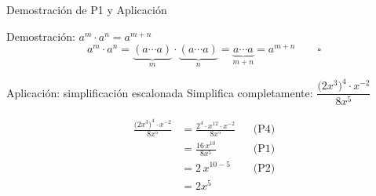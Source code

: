 \documentclass[12pt,aspectratio=169]{beamer}
\begin{document}
\begin{frame}{Demostraci\'on de P1 y Aplicaci\'on}
  \begin{block}{Demostraci\'on: $a^{m}\cdot a^{n}=a^{m+n}$}
    \[
      a^{m}\cdot a^{n}
      =\underbrace{(a\cdots a)}_{m}\cdot\underbrace{(a\cdots a)}_{n}
      =\underbrace{a\cdots a}_{m+n}=a^{m+n}\qquad\square
    \]
  \end{block}
  \vspace{6pt}
  \begin{cejec}{Aplicaci\'on: simplificaci\'on escalonada}
    Simplifica completamente:\quad
    $\dfrac{\bigl(2x^{3}\bigr)^{4}\cdot x^{-2}}{8x^{5}}$

    \medskip
    \begin{align*}
      \frac{\bigl(2x^{3}\bigr)^{4}\cdot x^{-2}}{8x^{5}}
        &=\frac{2^{4}\cdot x^{12}\cdot x^{-2}}{8x^{5}}
           &&\text{(P4)}\\[4pt]
        &=\frac{16\,x^{10}}{8x^{5}}
           &&\text{(P1)}\\[4pt]
        &=2\,x^{10-5}
           &&\text{(P2)}\\[4pt]
        &=\boxed{2x^{5}}
    \end{align*}
  \end{cejec}
\end{frame}
\end{document}
